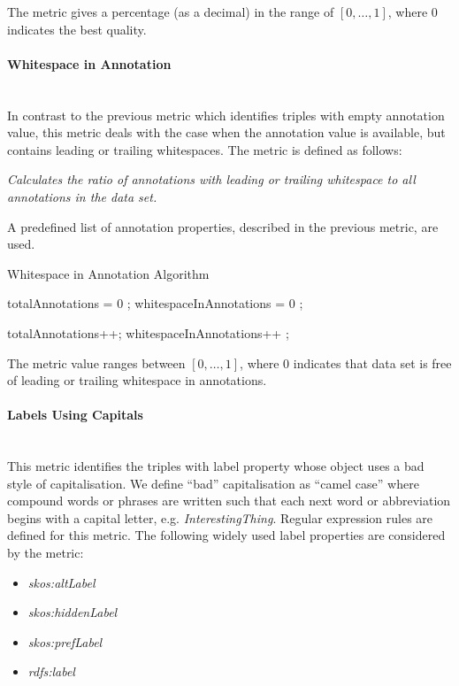 The metric gives a percentage (as a decimal) in the range of $[0,\ldots,1]$, where 0 indicates the best quality.

\paragraph{Whitespace in Annotation}~\\
In contrast to the previous metric which identifies triples with empty annotation value, this metric deals with the case when the annotation value is available, but contains leading or trailing whitespaces.
The metric is defined as follows:

\begin{mdframed}[style=metricdefinition]
\emph{Calculates the ratio of annotations with leading or trailing whitespace to all annotations in the data set.}
\end{mdframed}

A predefined list of annotation properties, described in the previous metric, are used. 

\begin{algorithm}
\caption{Whitespace in Annotation Algorithm}\label{lst:whitespace}
\begin{algorithmic}[1]
\State totalAnnotations = 0 ;
\State whitespaceInAnnotations = 0 ;
\EndProcedure

 totalAnnotations++; \EndIf
{} whitespaceInAnnotations++ ; \EndIf
{}
\EndProcedure
\end{algorithmic}
\end{algorithm}

The metric value ranges between $[0,\ldots,1]$, where  0 indicates that data set is free of leading or trailing whitespace in annotations.

\paragraph{Labels Using Capitals}~\\
This metric identifies the triples with label property whose object uses a bad style of capitalisation. 
We define ``bad'' capitalisation as ``camel case'' where compound words or phrases  are written such that each next word or abbreviation begins with a capital letter, e.g. \textit{InterestingThing}.
Regular expression rules are defined for this metric.
The following widely used label properties are considered by the metric:
\begin{itemize}
\item \textit{skos:altLabel}
\item \textit{skos:hiddenLabel}
\item \textit{skos:prefLabel}
\item \textit{rdfs:label}
\end{itemize}

